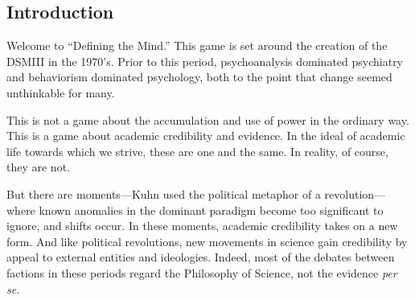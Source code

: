  \begin{refsection}
\def\mysubtitle{The struggle for legitimacy of psychology and psychiatry in the 1970’s\\ \large Instructor’s Manual}

\maketitle
\newpage
\startcontents[instructors]




% 





\renewcommand*{\thechapter}{\arabic{chapter}}


\setcounter{chapter}{0}
\mainmatter

\pagebreak 

\chapter{Introduction}
\label{introduction}

Welcome to “Defining the Mind.” This game is set around the creation of the DSMIII in the 1970’s. Prior to this period, psychoanalysis dominated psychiatry and behaviorism dominated psychology, both to the point that change seemed unthinkable for many.

This is not a game about the accumulation and use of power in the ordinary way. This is a game about academic credibility and evidence. In the ideal of academic life towards which we strive, these are one and the same. In reality, of course, they are not. 

But there are moments---Kuhn used the political metaphor of a revolution---where known anomalies in the dominant paradigm become too significant to ignore, and shifts occur. In these moments, academic credibility takes on a new form. And like political revolutions, new movements in science gain credibility by appeal to external entities and ideologies. Indeed, most of the debates between factions in these periods regard the Philosophy of Science, not the evidence \emph{per se}.


\end{refsection}
